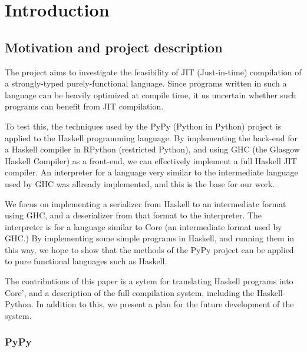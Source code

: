 
\chapter{Introduction}

\section{Motivation and project description}

The project aims to investigate the feasibility of JIT (Just-in-time) 
compilation of a strongly-typed purely-functional language. Since
programs written in such a language can be heavily optimized at 
compile time, it us uncertain whether such programs can benefit from
JIT compilation. 

To test this, the techniques 
used by the PyPy (Python in Python) project is applied to the Haskell 
programming language. By implementing the back-end for a Haskell compiler 
in RPython (restricted Python), and using GHC (the Glasgow Haskell Compiler) 
as a front-end, we can effectively implement a full Haskell JIT compiler. An 
interpreter for a language very similar to the intermediate language used
by GHC was allready implemented, and this is the base for our work.

We focus on implementing a serializer from Haskell to an intermediate
format using GHC, and a deserializer from that format to the interpreter. The 
interpreter is for a language similar to Core (an intermediate format used by GHC.)
By implementing some simple programs in Haskell, and running them in this way, 
we hope to show that the methods of the PyPy project can be applied to pure 
functional languages such as Haskell.

The contributions of this paper is a sytem for translating Haskell programs
into Core', and a description of the full compilation system, including the 
Haskell-Python. In addition to this,
we present a plan for the future development of the system.

\subsection{PyPy}

